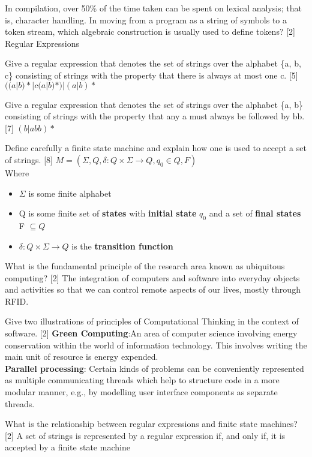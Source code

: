 \documentclass[grid,avery5371]{flashcards}
\begin{document}
\begin{flashcard}[]{In compilation, over 50\% of the time taken can be spent on lexical
analysis; that is, character handling. In moving from a program as a
string of symbols to a token stream, which algebraic construction is
usually used to define tokens? [2]}
Regular Expressions
\end{flashcard}


\begin{flashcard}[]{Give a regular expression that denotes the set of strings over the alphabet
\{a, b, c\} consisting of strings with the property that there is always at most one c. [5]}
$((a|b)*|c(a|b)*)|(a|b)* $
\end{flashcard}

\begin{flashcard}[]{Give a regular expression that denotes the set of strings over the alphabet
\{a, b\} consisting of strings with the property that any a must always be followed by bb. [7]}
$(b|abb)*$
\end{flashcard}

\begin{flashcard}[]{Define carefully a finite state machine and explain how one is used to
accept a set of strings. [8]}
$M=(\Sigma, Q,\delta:Q \times \Sigma \rightarrow Q, q_0 \in Q, F)$\\
Where
\begin{itemize}
\item $\Sigma$ is some finite alphabet
\item Q is some finite set of \textbf{states} with \textbf{initial state} $q_0$ and a set of \textbf{final states} F $\subseteq Q$
\item $\delta: Q\times \Sigma \rightarrow Q$ is the \textbf{transition function}
\end{itemize}


\end{flashcard}


\begin{flashcard}[]{What is the fundamental principle of the research area known as ubiquitous computing? [2]}
The integration of computers and software into everyday objects and activities so that we can control remote aspects of our lives, mostly through RFID.
\end{flashcard}

\begin{flashcard}[]{Give two illustrations of principles of Computational Thinking in the context of software. [2]}
{\normalsize \textbf{Green Computing}:An area of computer science involving energy conservation within the world of information technology. This involves writing the main unit of resource is energy expended.\\
\textbf{Parallel processing}: Certain kinds of problems can be conveniently represented as multiple communicating threads which help to structure code in a more modular manner, e.g., by modelling user interface components as separate threads.}

\end{flashcard}

\begin{flashcard}[]{What is the relationship between regular expressions and finite state machines? [2]}
A set of strings is represented by a regular expression if, and
only if, it is accepted by a finite state machine

\end{flashcard}
\end{document}
